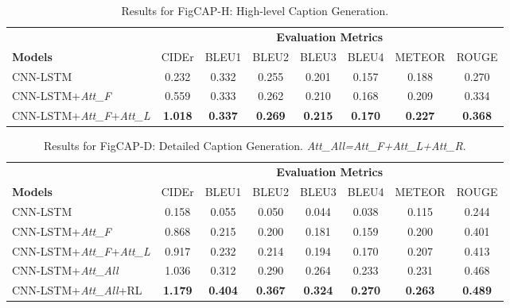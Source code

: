 \documentclass[11pt,a4paper]{article}
\begin{document}
\begin{table}[ht]
\small
\centering
\renewcommand{\arraystretch}{1.1} %
\begin{center}
\begin{tabular}{lccccccc}
\toprule[1.2pt]
&\multicolumn{7}{c}{\textbf{Evaluation Metrics}} \\
{\bf Models} & CIDEr & BLEU1 & BLEU2 & BLEU3 & BLEU4 & METEOR & ROUGE \\
\midrule
CNN-LSTM & 0.232 & 0.332 & 0.255 & 0.201 & 0.157 & 0.188 & 0.270\\
CNN-LSTM+\textit{Att\_F} & 0.559 & 0.333 & 0.262 & 0.210 & 0.168 & 0.209 & 0.334 \\
CNN-LSTM+\textit{Att\_F}+\textit{Att\_L} & {\bf 1.018} &	{\bf0.337} &	{\bf0.269} &	{\bf0.215} &	{\bf0.170} &	{\bf0.227} & {\bf0.368}\\

\bottomrule[1.2pt]
\end{tabular}
\caption{Results for FigCAP-H: High-level Caption Generation.}
\label{tab:res1}
\end{center}
\end{table}


\begin{table}[ht]
\small
\renewcommand{\arraystretch}{1.1} %
\begin{center}
\begin{tabular}{lccccccc}
\toprule[1.2pt]
&\multicolumn{7}{c}{\textbf{Evaluation Metrics}} \\
{\bf Models} & CIDEr & BLEU1 & BLEU2 & BLEU3 & BLEU4 & METEOR & ROUGE \\
\midrule
CNN-LSTM & 0.158 & 0.055 & 0.050 & 0.044 & 0.038 & 0.115 & 0.244\\
CNN-LSTM+\textit{Att\_F} & 0.868 & 0.215 & 0.200 & 0.181 & 0.159 & 0.200 &0.401\\
CNN-LSTM+\textit{Att\_F}+\textit{Att\_L} & 0.917 & 0.232 & 0.214 & 0.194 & 0.170 & 0.207 & 0.413 \\
CNN-LSTM+\textit{Att\_All} & 1.036 & 0.312 & 0.290 & 0.264 & 0.233 & 0.231 & 0.468 \\
CNN-LSTM+\textit{Att\_All}+RL & \textbf{1.179} & \textbf{0.404} & \textbf{0.367} & \textbf{0.324} & \textbf{0.270} & \textbf{0.263} & \textbf{0.489} \\
\bottomrule[1.2pt]
\end{tabular}
\caption{Results for FigCAP-D: Detailed Caption Generation. \textit{Att\_All=Att\_F+Att\_L+Att\_R}.}
\label{tab:res2}
\end{center}
\end{table}
\end{document}
